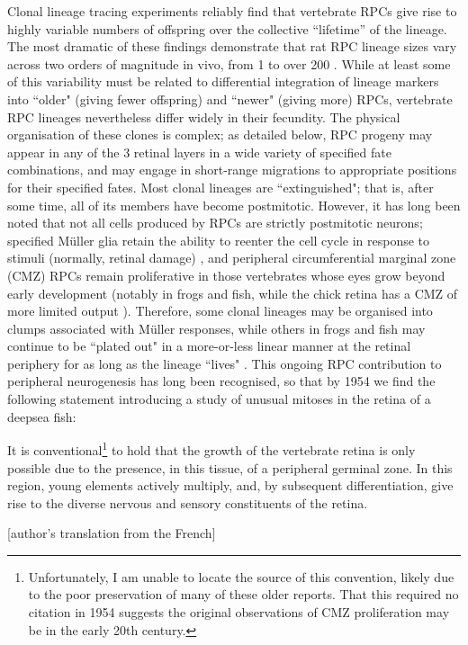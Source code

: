 Clonal lineage tracing experiments reliably find that vertebrate RPCs give rise to highly variable numbers of offspring over the collective ``lifetime'' of the lineage. The most dramatic of these findings demonstrate that rat RPC lineage sizes vary across two orders of magnitude in vivo, from 1 to over 200 \cite{Turner1990}. While at least some of this variability must be related to differential integration of lineage markers into ``older" (giving fewer offspring) and ``newer" (giving more) RPCs, vertebrate RPC lineages nevertheless differ widely in their fecundity. The physical organisation of these clones is complex; as detailed below, RPC progeny may appear in any of the 3 retinal layers in a wide variety of specified fate combinations, and may engage in short-range migrations to appropriate positions for their specified fates. Most clonal lineages are ``extinguished"; that is, after some time, all of its members have become postmitotic. However, it has long been noted that not all cells produced by RPCs are strictly postmitotic neurons; specified M{\"u}ller glia retain the ability to reenter the cell cycle in response to stimuli (normally, retinal damage) \cite{Dyer2000,Fischer2003a}, and peripheral circumferential marginal zone (CMZ) RPCs remain proliferative in those vertebrates whose eyes grow beyond early development (notably in frogs and fish, while the chick retina has a CMZ of more limited output \cite{Fischer2000}). Therefore, some clonal lineages may be organised into clumps associated with M{\"u}ller responses, while others in frogs and fish may continue to be ``plated out" in a more-or-less linear manner at the retinal periphery for as long as the lineage ``lives" \cite{Centanin2011}. This ongoing RPC contribution to peripheral neurogenesis has long been recognised, so that by 1954 we find the following statement introducing a study of unusual mitoses in the retina of a deepsea fish: 

\begin{longquote}
  It is conventional\footnote{Unfortunately, I am unable to locate the source of this convention, likely due to the poor preservation of many of these older reports. That this required no citation in 1954 suggests the original observations of CMZ proliferation may be in the early 20th century.} to hold that the growth of the vertebrate retina is only possible due to the presence, in this tissue, of a peripheral germinal zone. In this region, young elements actively multiply, and, by subsequent differentiation, give rise to the diverse nervous and sensory constituents of the retina.
  \cite{Vilter1954}
  
  [author's translation from the French]
\end{longquote}

